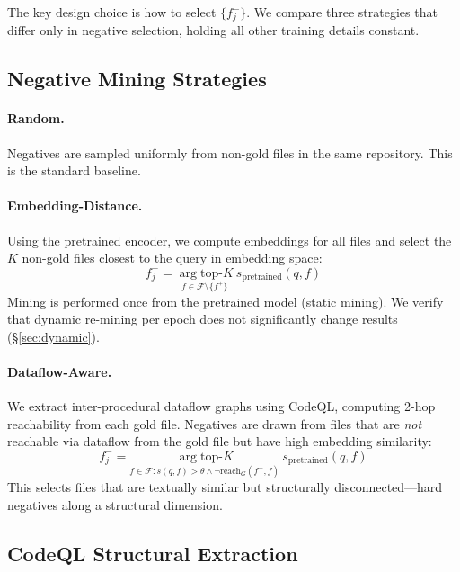 \documentclass[11pt,a4paper]{article}
\begin{document}
The key design choice is how to select $\{f_j^-\}$. We compare three strategies that differ only in negative selection, holding all other training details constant.

\subsection{Negative Mining Strategies}

\paragraph{Random.} Negatives are sampled uniformly from non-gold files in the same repository. This is the standard baseline.

\paragraph{Embedding-Distance.} Using the pretrained encoder, we compute embeddings for all files and select the $K$ non-gold files closest to the query in embedding space:
\begin{equation}
f_j^- = \underset{f \in \mathcal{F} \setminus \{f^+\}}{\arg\text{top-}K}\ s_{\text{pretrained}}(q, f)
\end{equation}
Mining is performed once from the pretrained model (static mining). We verify that dynamic re-mining per epoch does not significantly change results (\S\ref{sec:dynamic}).

\paragraph{Dataflow-Aware.} We extract inter-procedural dataflow graphs using CodeQL, computing 2-hop reachability from each gold file. Negatives are drawn from files that are \emph{not} reachable via dataflow from the gold file but have high embedding similarity:
\begin{equation}
f_j^- = \underset{f \in \mathcal{F} : s(q,f) > \theta \wedge \neg\text{reach}_G(f^+, f)}{\arg\text{top-}K}\ s_{\text{pretrained}}(q, f)
\end{equation}
This selects files that are textually similar but structurally disconnected---hard negatives along a structural dimension.

\subsection{CodeQL Structural Extraction}
\label{sec:codeql}
\end{document}

